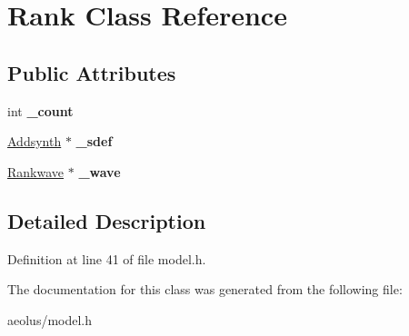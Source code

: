 \hypertarget{class_rank}{}\section{Rank Class Reference}
\label{class_rank}
\subsection*{Public Attributes}
\begin{DoxyCompactItemize}
\item 
\mbox{\label{class_rank_aa65976a1bafd482aa4107b5adcf5df44}} 
int {\bfseries \+\_\+count}
\item 
\mbox{\label{class_rank_ada092e9c35c11a2187cf7f2c887eecdc}} 
\hyperlink{class_addsynth}{Addsynth} $\ast$ {\bfseries \+\_\+sdef}
\item 
\mbox{\label{class_rank_ae0a26ddf72a6f44670c9d9b4f4affc7c}} 
\hyperlink{class_rankwave}{Rankwave} $\ast$ {\bfseries \+\_\+wave}
\end{DoxyCompactItemize}


\subsection{Detailed Description}


Definition at line 41 of file model.\+h.



The documentation for this class was generated from the following file\+:\begin{DoxyCompactItemize}
\item 
aeolus/model.\+h\end{DoxyCompactItemize}
